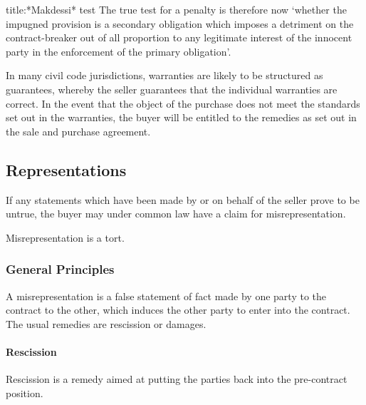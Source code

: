 \documentclass[
]{article}
\newenvironment{Shaded}{}{}
\newcommand{\NormalTok}[1]{#1}
\begin{document}
\begin{Shaded}
\begin{Highlighting}[]
\NormalTok{title:*Makdessi* test}
\NormalTok{The true test for a penalty is therefore now ‘whether the impugned provision is a secondary obligation which imposes a detriment on the contract{-}breaker out of all proportion to any legitimate interest of the innocent party in the enforcement of the primary obligation’.}
\end{Highlighting}
\end{Shaded}

In many civil code jurisdictions, warranties are likely to be structured
as guarantees, whereby the seller guarantees that the individual
warranties are correct. In the event that the object of the purchase
does not meet the standards set out in the warranties, the buyer will be
entitled to the remedies as set out in the sale and purchase agreement.

\hypertarget{representations}{%
\subsection{Representations}\label{representations}}

If any statements which have been made by or on behalf of the seller
prove to be untrue, the buyer may under common law have a claim for
misrepresentation.

\begin{Shaded}
\begin{Highlighting}[]
\NormalTok{Misrepresentation is a tort. }
\end{Highlighting}
\end{Shaded}

\hypertarget{general-principles-1}{%
\subsubsection{General Principles}\label{general-principles-1}}

A misrepresentation is a false statement of fact made by one party to
the contract to the other, which induces the other party to enter into
the contract. The usual remedies are rescission or damages.

\hypertarget{rescission}{%
\paragraph{Rescission}\label{rescission}}

Rescission is a remedy aimed at putting the parties back into the
pre-contract position.
\end{document}
